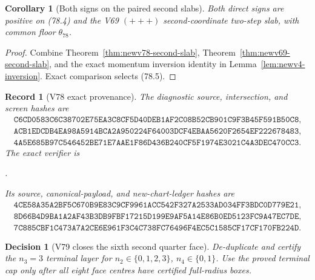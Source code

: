 \documentclass[11pt,oneside]{article}
\newtheorem{corollary}[theorem]{Corollary}
\newtheorem{record}[theorem]{Record}
\newtheorem{decision}[theorem]{Decision}
\theoremstyle{definition}
\theoremstyle{remark}
\begin{document}
\begin{corollary}[Both signs on the paired second slabs]
\label{cor:newv78-paired-slabs}
Both direct signs are positive on (78.4) and the V69
\((+++)\) second-coordinate two-step slab, with common floor
\(\theta_{78}\).
\end{corollary}

\begin{proof}
Combine Theorem~\ref{thm:newv78-second-slab},
Theorem~\ref{thm:newv69-second-slab}, and the exact momentum
inversion identity in Lemma~\ref{lem:newv4-inversion}.  Exact
comparison selects (78.5).
\end{proof}

\begin{record}[V78 exact provenance]
\label{rec:newv78-provenance}
The diagnostic source, intersection, and screen hashes are
\[
\begin{gathered}
\texttt{C6CD0583C6C38702E75EA3C8CF5D40DEB1AF2C08B52CB901C9F3B45F591B50C8},\\
\texttt{ACB1EDCDB4EA98A5914BCA2A950224F64003DCF4EBAA5620F2654EF222678483},\\
\texttt{4A5E685B97C546452BE71E7AAE1F86D436B240CF5F1974E3021C4A3DEC470CC3}.
\end{gathered}                                          \tag{78.6}
\]
The exact verifier is
\begin{center}\footnotesize
{}.
\end{center}
Its source, canonical-payload, and new-chart-ledger hashes are
\[
\begin{gathered}
\texttt{4CE58A35A2BF5C670B9E83C9CF9961ACC542F327A2533AD034FF3BDC0D779E21},\\
\texttt{8D66B4D9BA1A2AF43B3DB9FBF17215D199E9AF5A14E86B0ED5123FC9A47EC7DE},\\
\texttt{7C885CBF1C473A7A2CE6E961F3C4C738FC76496F4EC5C1585CF17CF170FB224D}.
\end{gathered}                                          \tag{78.7}
\]
\end{record}

\begin{decision}[V79 closes the sixth second quarter face]
\label{dec:newv78-next}
De-duplicate and certify the \(n_3=3\) terminal layer for
\(n_2\in\{0,1,2,3\}\), \(n_4\in\{0,1\}\).  Use the proved terminal
cap only after all eight face centres have certified full-radius
boxes.
\end{decision}
\end{document}
